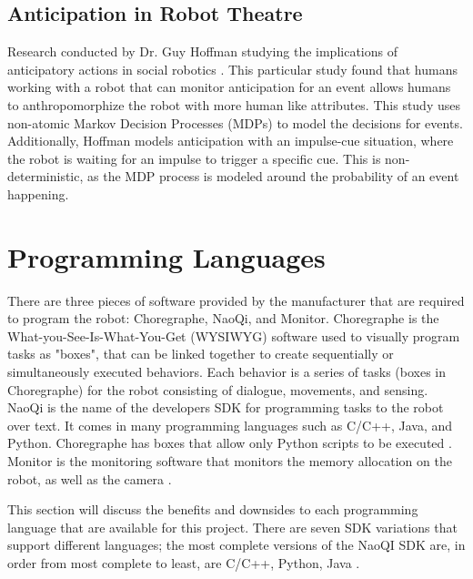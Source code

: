 \documentclass[onecolumn, draftclsnofoot,10pt, compsoc]{IEEEtran}
\begin{document}
  \subsection{Anticipation in Robot Theatre}
  Research conducted by Dr. Guy Hoffman studying the implications of anticipatory actions in social robotics \cite{hoffman2010anticipation}. This particular study found that humans working with a robot that can monitor anticipation for an event allows humans to anthropomorphize the robot with more human like attributes. This study uses non-atomic Markov Decision Processes (MDPs) to model the decisions for events. Additionally, Hoffman models anticipation with an impulse-cue situation, where the robot is waiting for an impulse to trigger a specific cue. This is non-deterministic, as the MDP process is modeled around the probability of an event happening.

\section{Programming Languages}

  There are three pieces of software provided by the manufacturer that are required to program the robot: Choregraphe, NaoQi, and Monitor. Choregraphe is the What-you-See-Is-What-You-Get (WYSIWYG) software used to visually program tasks as "boxes", that can be linked together to create sequentially or simultaneously executed behaviors. Each behavior is a series of tasks (boxes in Choregraphe) for the robot consisting of dialogue, movements, and sensing. NaoQi is the name of the developers SDK for programming tasks to the robot over text. It comes in many programming languages such as C/C++, Java, and Python. Choregraphe has boxes that allow only Python scripts to be executed \cite{programmingLanguages}. Monitor is the monitoring software that monitors the memory allocation on the robot, as well as the camera \cite{monitor}.

  This section will discuss the benefits and downsides to each programming language that are available for this project. There are seven SDK variations that support different languages; the most complete versions of the NaoQI SDK are, in order from most complete to least, are C/C++, Python, Java \cite{programmingLanguages}.  
 
\end{document}
